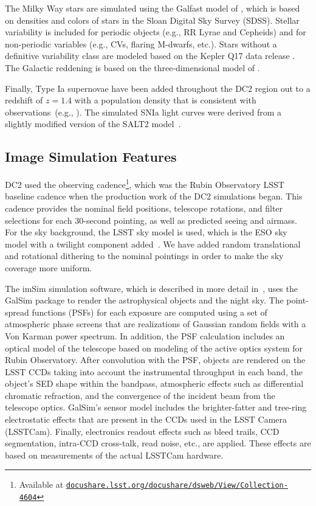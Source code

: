 \documentclass[modern]{descnote}
\newcommand*{\https}[1]{\href{https://#1}{\nolinkurl{#1}}}
\begin{document}
The Milky Way stars are simulated using the Galfast model of \citet{2008ApJ...673..864J}, which is based on densities and colors of stars in the Sloan Digital Sky Survey (SDSS). Stellar variability is included for periodic objects (e.g., RR Lyrae and Cepheids) and for non-periodic variables (e.g., CVs, flaring M-dwarfs, etc.).  Stars without a definitive variability class are modeled based on the Kepler Q17 data release \citep{2016ksci.rept....3T}.  The Galactic reddening is based on the three-dimensional model of \cite{2005AJ....130..659A}.

Finally, Type Ia supernovae have been added throughout the DC2 region out to a redshift of $z=1.4$ with a population density that is consistent with observations~(e.g., \citealt{2010ApJ...713.1026D}). The simulated SNIa light curves were derived from a slightly modified version of the SALT2 model~\citep{2007A&A...466...11G}.

\subsection{Image Simulation Features}

DC2 used the  observing cadence\footnote{Available at \https{docushare.lsst.org/docushare/dsweb/View/Collection-4604}}, which was the Rubin Observatory LSST baseline cadence when the production work of the DC2 simulations began. This cadence provides the nominal field positions, telescope rotations, and filter selections for each 30-second pointing, as well as predicted seeing and airmass.  For the sky background, the LSST sky model is used, which is the ESO sky model with a twilight component added~\citep{2016SPIE.9910E..1AY}.  We have added random translational and rotational dithering to the nominal pointings in order to make the sky coverage more uniform.

The imSim simulation software, which is described in more detail in~\cite{2020arXiv201005926L}, uses the GalSim package \citep{2015A&C....10..121R} to render the astrophysical objects and the night sky.  The point-spread functions (PSFs) for each exposure are computed using a set of atmospheric phase screens that are realizations of Gaussian random fields with a Von Karman power spectrum.  In addition, the PSF calculation includes an optical model of the telescope based on modeling of the active optics system for Rubin Observatory.  After convolution with the PSF, objects are rendered on the LSST CCDs taking into account the instrumental throughput in each band, the object's SED shape within the bandpass, atmospheric effects such as differential chromatic refraction, and the convergence of the incident beam from the telescope optics. GalSim's sensor model includes the brighter-fatter and tree-ring electrostatic effects that are present in the CCDs used in the LSST Camera (LSSTCam).  Finally, electronics readout effects such as bleed trails, CCD segmentation, intra-CCD cross-talk, read noise, etc., are applied.  These effects are based on measurements of the actual LSSTCam hardware.
\end{document}
